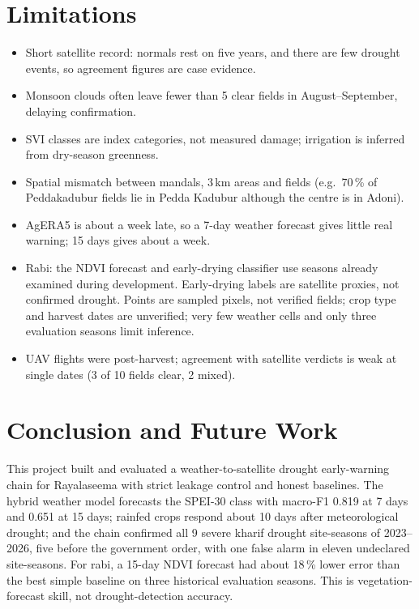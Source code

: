 \documentclass[11pt,a4paper,oneside]{article}
\newcommand{\mf}{macro-F1}
\begin{document}
\section{Limitations}
\begin{itemize}
\item Short satellite record: normals rest on five years, and there are few drought events, so agreement figures are case evidence.
\item Monsoon clouds often leave fewer than 5 clear fields in August--September, delaying confirmation.
\item SVI classes are index categories, not measured damage; irrigation is inferred from dry-season greenness.
\item Spatial mismatch between mandals, 3\,km areas and fields (e.g.\ 70\,\% of Peddakadubur fields lie in Pedda Kadubur although the centre is in Adoni).
\item AgERA5 is about a week late, so a 7-day weather forecast gives little real warning; 15 days gives about a week.
\item Rabi: the NDVI forecast and early-drying classifier use seasons already examined during development. Early-drying labels are satellite proxies, not confirmed drought. Points are sampled pixels, not verified fields; crop type and harvest dates are unverified; very few weather cells and only three evaluation seasons limit inference.
\item UAV flights were post-harvest; agreement with satellite verdicts is weak at single dates (3 of 10 fields clear, 2 mixed).
\end{itemize}

\section{Conclusion and Future Work}
This project built and evaluated a weather-to-satellite drought early-warning chain for Rayalaseema with strict leakage control and honest baselines. The hybrid weather model forecasts the SPEI-30 class with \mf{} 0.819 at 7 days and 0.651 at 15 days; rainfed crops respond about 10 days after meteorological drought; and the chain confirmed all 9 severe kharif drought site-seasons of 2023--2026, five before the government order, with one false alarm in eleven undeclared site-seasons. For rabi, a 15-day NDVI forecast had about 18\,\% lower error than the best simple baseline on three historical evaluation seasons. This is vegetation-forecast skill, not drought-detection accuracy.
\end{document}
